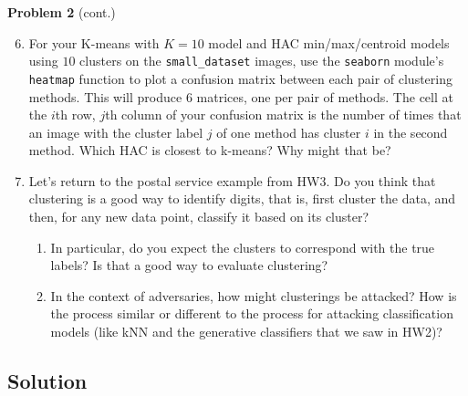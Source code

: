 \documentclass[submit]{harvardml}
\begin{document}
\newpage
\begin{framed}
\noindent\textbf{Problem 2} (cont.)\\
\begin{enumerate}
\setcounter{enumi}{5}
\item For your K-means with $K = 10$ model and HAC min/max/centroid
  models using $10$ clusters on the \texttt{small\_dataset} images,
  use the \texttt{seaborn} module's \texttt{heatmap} function to plot
  a confusion matrix between each pair of clustering methods.  This
  will produce 6 matrices, one per pair of methods. The cell at the
  $i$th row, $j$th column of your confusion matrix is the number of
  times that an image with the cluster label $j$ of one method has
  cluster $i$ in the second method.  Which HAC is closest to k-means?
  Why might that be?


\item Let's return to the postal service example from HW3.  Do you
  think that clustering is a good way to identify digits, that is,
  first cluster the data, and then, for any new data point, classify
  it based on its cluster?
  \begin{enumerate}
\item In particular, do you expect the clusters to correspond with the
  true labels?  Is that a good way to evaluate clustering?
\item In the context of adversaries, how might clusterings be
  attacked?  How is the process similar or different to the process
  for attacking classification models (like kNN and the generative classifiers that we saw in HW2)?
\end{enumerate}
  
\end{enumerate}
\end{framed}


\subsection*{Solution}


\newpage
\end{document}
